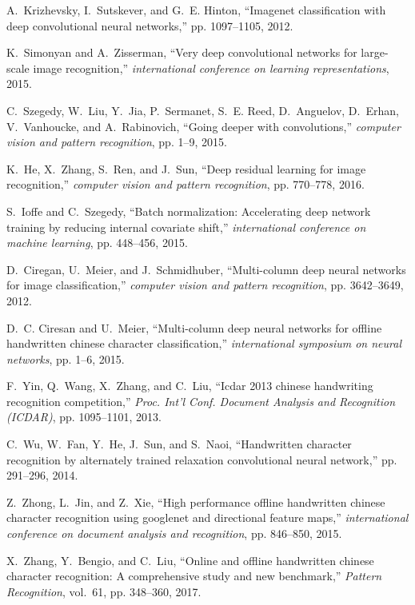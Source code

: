\documentclass[conference]{IEEEtran}
\begin{document}
\begin{thebibliography}{1}
A.~Krizhevsky, I.~Sutskever, and G.~E. Hinton, ``Imagenet classification with
deep convolutional neural networks,'' pp. 1097--1105, 2012.

K.~Simonyan and A.~Zisserman, ``Very deep convolutional networks for
large-scale image recognition,'' \emph{international conference on learning
	representations}, 2015.

C.~Szegedy, W.~Liu, Y.~Jia, P.~Sermanet, S.~E. Reed, D.~Anguelov, D.~Erhan,
V.~Vanhoucke, and A.~Rabinovich, ``Going deeper with convolutions,''
\emph{computer vision and pattern recognition}, pp. 1--9, 2015.

K.~He, X.~Zhang, S.~Ren, and J.~Sun, ``Deep residual learning for image
recognition,'' \emph{computer vision and pattern recognition}, pp. 770--778,
2016.

S.~Ioffe and C.~Szegedy, ``Batch normalization: Accelerating deep network
training by reducing internal covariate shift,'' \emph{international
	conference on machine learning}, pp. 448--456, 2015.

D.~Ciregan, U.~Meier, and J.~Schmidhuber, ``Multi-column deep neural networks
for image classification,'' \emph{computer vision and pattern recognition},
pp. 3642--3649, 2012.

D.~C. Ciresan and U.~Meier, ``Multi-column deep neural networks for offline
handwritten chinese character classification,'' \emph{international symposium
	on neural networks}, pp. 1--6, 2015.

F.~Yin, Q.~Wang, X.~Zhang, and C.~Liu, ``Icdar 2013 chinese handwriting
recognition competition,'' \emph{Proc. Int’l Conf. Document Analysis and
	Recognition (ICDAR)}, pp. 1095--1101, 2013.

C.~Wu, W.~Fan, Y.~He, J.~Sun, and S.~Naoi, ``Handwritten character recognition
by alternately trained relaxation convolutional neural network,'' pp.
291--296, 2014.

Z.~Zhong, L.~Jin, and Z.~Xie, ``High performance offline handwritten chinese
character recognition using googlenet and directional feature maps,''
\emph{international conference on document analysis and recognition}, pp.
846--850, 2015.

X.~Zhang, Y.~Bengio, and C.~Liu, ``Online and offline handwritten chinese
character recognition: A comprehensive study and new benchmark,''
\emph{Pattern Recognition}, vol.~61, pp. 348--360, 2017.


\end{thebibliography}
\end{document}
